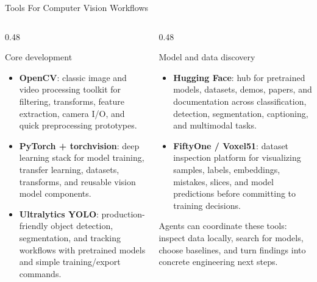 \documentclass[aspectratio=169]{beamer}
\begin{document}
\begin{frame}{Tools For Computer Vision Workflows}
  \begin{columns}[T,onlytextwidth]
    \begin{column}{0.48\textwidth}
      \small
      \begin{block}{Core development}
        \scriptsize
        \begin{itemize}
          \item \textbf{OpenCV}: classic image and video processing toolkit for
          filtering, transforms, feature extraction, camera I/O, and quick
          preprocessing prototypes.
          \item \textbf{PyTorch + torchvision}: deep learning stack for model
          training, transfer learning, datasets, transforms, and reusable
          vision model components.
          \item \textbf{Ultralytics YOLO}: production-friendly object detection,
          segmentation, and tracking workflows with pretrained models and
          simple training/export commands.
        \end{itemize}
      \end{block}
    \end{column}
    \begin{column}{0.48\textwidth}
      \small
      \begin{block}{Model and data discovery}
        \scriptsize
        \begin{itemize}
          \item \textbf{Hugging Face}: hub for pretrained models, datasets,
          demos, papers, and documentation across classification, detection,
          segmentation, captioning, and multimodal tasks.
          \item \textbf{FiftyOne / Voxel51}: dataset inspection platform for
          visualizing samples, labels, embeddings, mistakes, slices, and model
          predictions before committing to training decisions.
        \end{itemize}
      \end{block}
      \vspace{0.12cm}
      {\scriptsize\color{tamugray}Agents can coordinate these tools: inspect
      data locally, search for models, choose baselines, and turn findings into
      concrete engineering next steps.}
    \end{column}
  \end{columns}
\end{frame}
\end{document}
